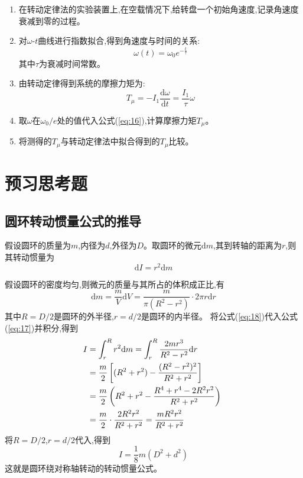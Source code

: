\documentclass[UTF8]{ctexart}
\begin{document}
    \begin{enumerate}
    \item 在转动定律法的实验装置上,在空载情况下,给转盘一个初始角速度,记录角速度衰减到零的过程。
    \item 对$\omega$-$t$曲线进行指数拟合,得到角速度与时间的关系:
    \begin{equation}
    \omega(t)=\omega_0e^{-\frac{t}{\tau}} \label{eq:15}
    \end{equation}
    其中$\tau$为衰减时间常数。
    \item 由转动定律得到系统的摩擦力矩为:
    \begin{equation}
    T_\mu=-I_1\frac{\mathrm{d}\omega}{\mathrm{d}t}=\frac{I_1}{\tau}\omega \label{eq:16}
    \end{equation}
    \item 取$\omega$在$\omega_0/e$处的值代入公式(\ref{eq:16}),计算摩擦力矩$T_\mu$。
    \item 将测得的$T_\mu$与转动定律法中拟合得到的$T_\mu$比较。
    \end{enumerate}
    
    \section{预习思考题}
\subsection{圆环转动惯量公式的推导}
假设圆环的质量为$m$,内径为$d$,外径为$D$。取圆环的微元$\mathrm{d}m$,其到转轴的距离为$r$,则其转动惯量为
\begin{equation}
\mathrm{d}I=r^2\mathrm{d}m \label{eq:17}
\end{equation}

假设圆环的密度均匀,则微元的质量与其所占的体积成正比,有
\begin{equation}
\mathrm{d}m=\frac{m}{V}\mathrm{d}V=\frac{m}{\pi(R^2-r^2)}\cdot 2\pi r\mathrm{d}r \label{eq:18}
\end{equation}
其中$R=D/2$是圆环的外半径,$r=d/2$是圆环的内半径。
将公式(\ref{eq:18})代入公式(\ref{eq:17})并积分,得到
\begin{align}
I &= \int_{r}^{R} r^2\mathrm{d}m = \int_{r}^{R} \frac{2mr^3}{R^2-r^2}\mathrm{d}r \notag\
\\&= \frac{m}{2}\left[(R^2+r^2)-\frac{(R^2-r^2)^2}{R^2+r^2}\right] \notag\
\\&= \frac{m}{2}\left(R^2+r^2-\frac{R^4+r^4-2R^2r^2}{R^2+r^2}\right) \notag\
\\&= \frac{m}{2}\cdot\frac{2R^2r^2}{R^2+r^2} = \frac{mR^2r^2}{R^2+r^2} \label{eq:19}
\end{align}
将$R=D/2$,$r=d/2$代入,得到
\begin{equation}
I=\frac{1}{8}m(D^2+d^2) \label{eq:20}
\end{equation}
这就是圆环绕对称轴转动的转动惯量公式。
\end{document}
